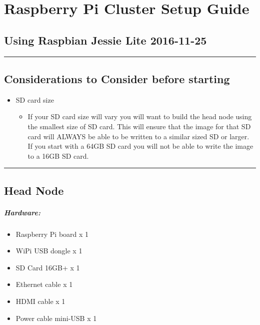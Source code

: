 \documentclass[]{article}
\date{}
\providecommand{\tightlist}{%
  \setlength{\itemsep}{0pt}\setlength{\parskip}{0pt}}
\let\oldsubparagraph\subparagraph
\renewcommand{\subparagraph}[1]{\oldsubparagraph{#1}\mbox{}}
\begin{document}
\section{Raspberry Pi Cluster Setup
Guide}\label{raspberry-pi-cluster-setup-guide}

\subsection{Using Raspbian Jessie Lite
2016-11-25}\label{using-raspbian-jessie-lite-2016-11-25}

\begin{center}\rule{0.5\linewidth}{\linethickness}\end{center}

\subsection{Considerations to Consider before
starting}\label{considerations-to-consider-before-starting}

\begin{itemize}
\tightlist
\item
  SD card size

  \begin{itemize}
  \tightlist
  \item
    If your SD card size will vary you will want to build the head node
    using the smallest size of SD card. This will ensure that the image
    for that SD card will ALWAYS be able to be written to a similar
    sized SD or larger. If you start with a 64GB SD card you will not be
    able to write the image to a 16GB SD card.
  \end{itemize}
\end{itemize}

\begin{center}\rule{0.5\linewidth}{\linethickness}\end{center}

\subsection{Head Node}\label{head-node}

\subparagraph{Hardware:}\label{hardware}

\begin{itemize}
\tightlist
\item
  Raspberry Pi board x 1
\item
  WiPi USB dongle x 1
\item
  SD Card 16GB+ x 1
\item
  Ethernet cable x 1
\item
  HDMI cable x 1
\item
  Power cable mini-USB x 1
\end{itemize}
\end{document}
